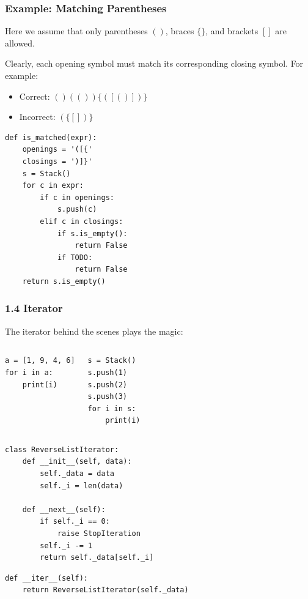 \documentclass[aspectratio=169, 14pt]{beamer}
\begin{document}
\begin{frame}
    \frametitle{Example: Matching Parentheses}

    Here we assume that only parentheses $()$, braces $\{\}$, and brackets $[]$ are allowed.

    Clearly, each opening symbol must match its corresponding closing symbol. For example:

    \begin{itemize}
        \item Correct: $()(())\{([()])\}$
        \item Incorrect: $(\{[])\}$
    \end{itemize}

\end{frame}

\begin{frame}[fragile]
    \begin{verbatim}
def is_matched(expr):
    openings = '([{'
    closings = ')]}'
    s = Stack()
    for c in expr:
        if c in openings:
            s.push(c)
        elif c in closings:
            if s.is_empty():
                return False
            if TODO:
                return False
    return s.is_empty()
    \end{verbatim}  

\end{frame}

\begin{frame}[fragile]
    \frametitle{1.4 Iterator}
    The \alert{iterator} behind the scenes plays the magic:

    \begin{columns}
        \begin{verbatim}
a = [1, 9, 4, 6]
for i in a:
    print(i)    
    \end{verbatim}
        \begin{verbatim}
s = Stack()
s.push(1)
s.push(2)
s.push(3)
for i in s:
    print(i)
    \end{verbatim}

    \end{columns}
\end{frame}

\begin{frame}[fragile]
    \begin{verbatim}
class ReverseListIterator:
    def __init__(self, data):
        self._data = data
        self._i = len(data)

    def __next__(self):
        if self._i == 0:
            raise StopIteration
        self._i -= 1
        return self._data[self._i]  
    \end{verbatim}

        \begin{verbatim}
def __iter__(self):
    return ReverseListIterator(self._data)        
        \end{verbatim}

\end{frame}
\end{document}
